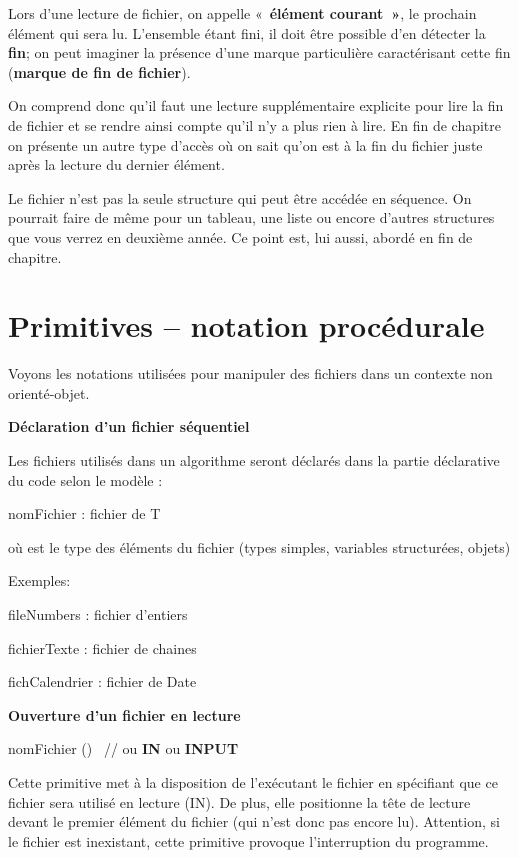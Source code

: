 {
Lors d'une lecture de fichier, on appelle
«~\textbf{élément courant~»}, le prochain élément qui sera lu.
L’ensemble étant fini, il doit être possible d’en détecter la
\textbf{fin}; on peut imaginer la présence d’une marque particulière
caractérisant cette fin (\textbf{marque de fin de fichier}). }

{
On comprend donc qu'il faut une lecture supplémentaire
explicite pour lire la fin de fichier et se rendre ainsi compte
qu'il n'y a plus rien à lire. En fin
de chapitre on présente un autre type d'accès où on
sait qu'on est à la fin du fichier juste après la
lecture du dernier élément.}

{
Le fichier n'est pas la seule structure qui peut être
accédée en séquence. On pourrait faire de même pour un tableau, une
liste ou encore d'autres structures que vous verrez en
deuxième année. Ce point est, lui aussi, abordé en fin de chapitre.}

\section{Primitives – notation procédurale}
{
Voyons les notations utilisées pour manipuler des fichiers dans un
contexte non orienté-objet.}

{\sffamily\bfseries\upshape
Déclaration d’un fichier séquentiel }

{
Les fichiers utilisés dans un algorithme seront déclarés dans la partie
déclarative du code selon le modèle : }

{\sffamily
nomFichier : fichier de T }

{
où  est le type des éléments du fichier (types
simples, variables structurées, objets)}

{
Exemples:}

{\sffamily
fileNumbers : fichier d’entiers }

{\sffamily
fichierTexte : fichier de chaines }

{\sffamily
fichCalendrier : fichier de Date }

{\sffamily\bfseries\upshape
Ouverture d’un fichier en lecture }

{\sffamily
{} nomFichier () \ // ou
\textbf{IN }ou\textbf{ INPUT} }

{
Cette primitive met à la disposition de l’exécutant le fichier
 en spécifiant que ce fichier sera
utilisé en lecture (IN). De plus, elle positionne la tête de lecture
devant le premier élément du fichier (qui n’est donc pas encore lu).
Attention, si le fichier  est inexistant,
cette primitive provoque l’interruption du programme. }

